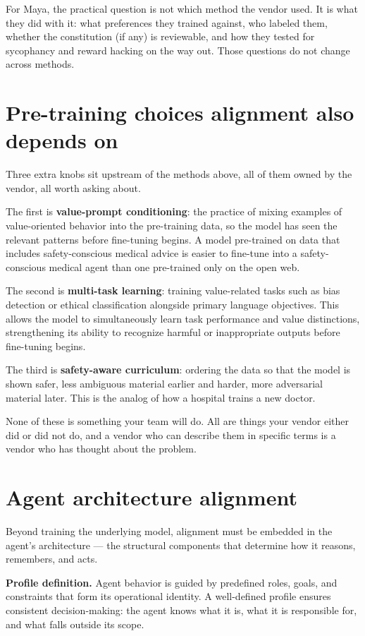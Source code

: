 For Maya, the practical question is not which method the vendor used. It is what they did with it: what preferences they trained against, who labeled them, whether the constitution (if any) is reviewable, and how they tested for sycophancy and reward hacking on the way out. Those questions do not change across methods.

\section{Pre-training choices alignment also depends on}

Three extra knobs sit upstream of the methods above, all of them owned by the vendor, all worth asking about.

The first is \textbf{value-prompt conditioning}: the practice of mixing examples of value-oriented behavior into the pre-training data, so the model has seen the relevant patterns before fine-tuning begins. A model pre-trained on data that includes safety-conscious medical advice is easier to fine-tune into a safety-conscious medical agent than one pre-trained only on the open web.

The second is \textbf{multi-task learning}: training value-related tasks such as bias detection or ethical classification alongside primary language objectives. This allows the model to simultaneously learn task performance and value distinctions, strengthening its ability to recognize harmful or inappropriate outputs before fine-tuning begins.

The third is \textbf{safety-aware curriculum}: ordering the data so that the model is shown safer, less ambiguous material earlier and harder, more adversarial material later. This is the analog of how a hospital trains a new doctor.

None of these is something your team will do. All are things your vendor either did or did not do, and a vendor who can describe them in specific terms is a vendor who has thought about the problem.

\section{Agent architecture alignment}

Beyond training the underlying model, alignment must be embedded in the agent's architecture --- the structural components that determine how it reasons, remembers, and acts.

\textbf{Profile definition.} Agent behavior is guided by predefined roles, goals, and constraints that form its operational identity. A well-defined profile ensures consistent decision-making: the agent knows what it is, what it is responsible for, and what falls outside its scope.

